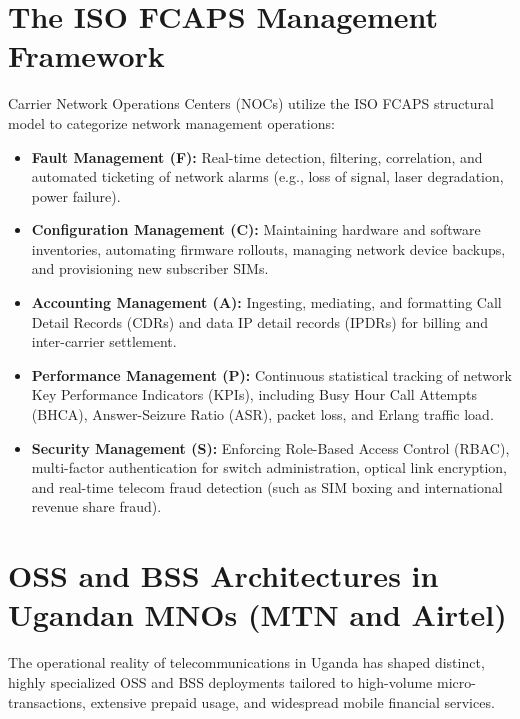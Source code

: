 \documentclass[12pt,a4paper]{report}
\begin{document}
\section{The ISO FCAPS Management Framework}
Carrier Network Operations Centers (NOCs) utilize the ISO FCAPS structural model to categorize network management operations:
\begin{itemize}
    \item \textbf{Fault Management (F):} Real-time detection, filtering, correlation, and automated ticketing of network alarms (e.g., loss of signal, laser degradation, power failure).
    \item \textbf{Configuration Management (C):} Maintaining hardware and software inventories, automating firmware rollouts, managing network device backups, and provisioning new subscriber SIMs.
    \item \textbf{Accounting Management (A):} Ingesting, mediating, and formatting Call Detail Records (CDRs) and data IP detail records (IPDRs) for billing and inter-carrier settlement.
    \item \textbf{Performance Management (P):} Continuous statistical tracking of network Key Performance Indicators (KPIs), including Busy Hour Call Attempts (BHCA), Answer-Seizure Ratio (ASR), packet loss, and Erlang traffic load.
    \item \textbf{Security Management (S):} Enforcing Role-Based Access Control (RBAC), multi-factor authentication for switch administration, optical link encryption, and real-time telecom fraud detection (such as SIM boxing and international revenue share fraud).
\end{itemize}

\section{OSS and BSS Architectures in Ugandan MNOs (MTN and Airtel)}
The operational reality of telecommunications in Uganda has shaped distinct, highly specialized OSS and BSS deployments tailored to high-volume micro-transactions, extensive prepaid usage, and widespread mobile financial services.
\end{document}

